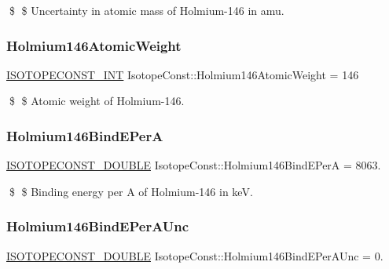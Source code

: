 \$ \$ Uncertainty in atomic mass of Holmium-\/146 in amu. \mbox{\label{group___isotope_const-_holmium-_ho146_ga5ccb26d4039cf84c89d591a79adccbe7}} 
\subsubsection{\texorpdfstring{Holmium146\+Atomic\+Weight}{Holmium146AtomicWeight}}
{\footnotesize\ttfamily \mbox{\hyperlink{group___isotope_const-_macros_ga5f18360b3e99483a35c32d789e62621c}{I\+S\+O\+T\+O\+P\+E\+C\+O\+N\+S\+T\+\_\+\+I\+NT}} Isotope\+Const\+::\+Holmium146\+Atomic\+Weight = 146}

\$ \$ Atomic weight of Holmium-\/146. \mbox{\label{group___isotope_const-_holmium-_ho146_ga9cdd6d93a047d84ea56ff868c53784a9}} 
\subsubsection{\texorpdfstring{Holmium146\+Bind\+E\+PerA}{Holmium146BindEPerA}}
{\footnotesize\ttfamily \mbox{\hyperlink{group___isotope_const-_macros_ga8f45a7272ce02c0b4c65c44636ed719a}{I\+S\+O\+T\+O\+P\+E\+C\+O\+N\+S\+T\+\_\+\+D\+O\+U\+B\+LE}} Isotope\+Const\+::\+Holmium146\+Bind\+E\+PerA = 8063.}

\$ \$ Binding energy per A of Holmium-\/146 in keV. \mbox{\label{group___isotope_const-_holmium-_ho146_ga65eb99a8474f760e8ff863f7599a2d90}} 
\subsubsection{\texorpdfstring{Holmium146\+Bind\+E\+Per\+A\+Unc}{Holmium146BindEPerAUnc}}
{\footnotesize\ttfamily \mbox{\hyperlink{group___isotope_const-_macros_ga8f45a7272ce02c0b4c65c44636ed719a}{I\+S\+O\+T\+O\+P\+E\+C\+O\+N\+S\+T\+\_\+\+D\+O\+U\+B\+LE}} Isotope\+Const\+::\+Holmium146\+Bind\+E\+Per\+A\+Unc = 0.}

